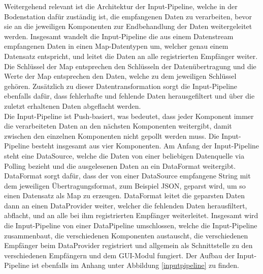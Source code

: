 Weitergehend relevant ist die Architektur der Input-Pipeline, welche in der Bodenstation dafür zuständig ist, die empfangenen Daten zu verarbeiten, bevor sie an die jeweiligen Komponenten zur Endbehandlung der Daten weitergeleitet werden. Insgesamt wandelt die Input-Pipeline die aus einem Datenstream empfangenen Daten in einen Map-Datentypen um, welcher genau einem Datensatz entspricht, und leitet die Daten an alle registrierten Empfänger weiter. Die Schlüssel der Map entsprechen den Schlüsseln der Datenübertragung und die Werte der Map entsprechen den Daten, welche zu dem jeweiligen Schlüssel gehören. Zusätzlich zu dieser Datentransformation sorgt die Input-Pipeline ebenfalls dafür, dass fehlerhafte und fehlende Daten herausgefiltert und über die zuletzt erhaltenen Daten abgeflacht werden. \\
Die Input-Pipeline ist Push-basiert, was bedeutet, dass jeder Komponent immer die verarbeiteten Daten an den nächsten Komponenten weitergibt, damit zwischen den einzelnen Komponenten nicht gepollt werden muss. Die Input-Pipeline besteht insgesamt aus vier Komponenten. Am Anfang der Input-Pipeline steht eine DataSource, welche die Daten von einer beliebigen Datenquelle via Polling bezieht und die ausgelesenen Daten an ein DataFormat weitergibt. DataFormat sorgt dafür, dass der von einer DataSource empfangene String mit dem jeweiligen Übertragungsformat, zum Beispiel JSON, geparst wird, um so einen Datensatz als Map zu erzeugen. DataFormat leitet die geparsten Daten dann an einen DataProvider weiter, welcher die fehlenden Daten herausfiltert, abflacht, und an alle bei ihm registrierten Empfänger weiterleitet. Insgesamt wird die Input-Pipeline von einer DataPipeline umschlossen, welche die Input-Pipeline zusammenbaut, die verschiedenen Komponenten austauscht, die verschiedenen Empfänger beim DataProvider registriert und allgemein als Schnittstelle zu den verschiedenen Empfängern und dem GUI-Modul fungiert.
Der Aufbau der Input-Pipeline ist ebenfalls im Anhang unter Abbildung \ref{inputpipeline} zu finden.